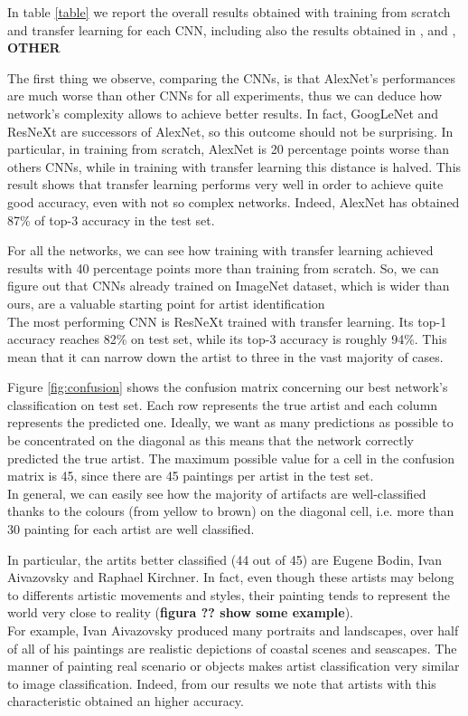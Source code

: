 \documentclass{article}
\begin{document}
In table \ref{table} we report the overall results obtained with training  from scratch and transfer learning for each CNN, including also the results obtained in \cite{ArtistIdCNN406}, \cite{Saleh2015} and \cite{mensink2014}, \textbf{OTHER}

The first thing we observe, comparing the CNNs, is that AlexNet's performances are much worse than other CNNs for all experiments, thus we can deduce how network's complexity allows to achieve better results. In fact, GoogLeNet and ResNeXt are successors of AlexNet, so this outcome should not be surprising. 
In particular, in training from scratch, AlexNet is 20 percentage points worse than others CNNs, while in training with transfer learning this distance is halved. This result shows that transfer learning performs very well in order to achieve quite good accuracy, even with not so complex networks. Indeed, AlexNet has obtained 87\% of top-3 accuracy in the test set.

For all the networks, we can see how training with transfer learning achieved results with 40 percentage points more than training from scratch. So, we can figure out that CNNs already trained on ImageNet dataset, which is wider than ours,  are a valuable starting point for artist identification\\
The most performing CNN is ResNeXt trained with transfer learning. Its top-1 accuracy reaches 82\% on test set, while its top-3 accuracy is roughly 94\%. This mean that it can narrow down the artist to three in the vast majority of cases.

Figure \ref{fig:confusion} shows the confusion matrix concerning our best network's classification on test set. Each row represents the true artist and each column represents the predicted one. Ideally, we want as many predictions as possible to be concentrated on the diagonal as this means that the network correctly predicted the true artist. The maximum possible value for a cell in the confusion matrix is 45, since there are 45 paintings per artist in the test set.\\
In general, we can easily see how the majority of artifacts are well-classified thanks to the colours (from yellow to brown) on the diagonal cell, i.e. more than 30 painting for each artist are well classified.

In particular, the artits better classified (44 out of 45) are Eugene Bodin, Ivan Aivazovsky and Raphael Kirchner. In fact, even though these artists may belong to differents artistic movements and styles, their painting tends to represent the world very close to reality (\textbf{figura ?? show some example}).\\
For example, Ivan Aivazovsky produced many portraits and landscapes, over half of all of his paintings are realistic depictions of coastal scenes and seascapes. The manner of painting real scenario or objects makes artist classification very similar to image classification. Indeed, from our results we note that artists with this characteristic obtained an higher accuracy.
\end{document}
